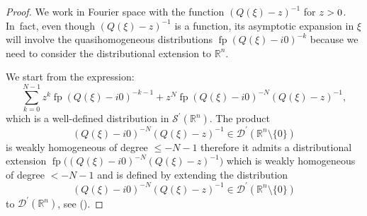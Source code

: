 \documentclass[10pt]{amsart}
\let\pazocal\mathscr
\theoremstyle{definition}
\let\Im\relax
\DeclareMathOperator{\Im}{Im}
\DeclareMathOperator*{\pf}{fp}
\begin{document}
\begin{proof}
We work in Fourier space with
the function $\left(Q(\xi)-z\right)^{-1}$ for $\Im z>0$.
In~fact, even though $\left(Q(\xi)-z\right)^{-1}$ is a function, its asymptotic expansion in $\xi$ will involve the quasihomogeneous distributions
$\pf(Q(\xi)-i0)^{-k}$
because we need to consider the distributional extension to $\mathbb{R}^n$.

We start from the expression:
\[
\sum_{k=0}^{N-1} z^k\pf \left(Q(\xi)-i0\right)^{-k-1}+z^N\pf\left(Q(\xi)-i0\right)^{-N} \left(Q(\xi)-z\right)^{-1},
\]
which is a well-defined
distribution in $\pazocal{S}^\prime(\mathbb{R}^n)$.
The product
\[
\left(Q(\xi)-i0\right)^{-N} \left(Q(\xi)-z\right)^{-1} \in \pazocal{D}^\prime(\mathbb{R}^n\setminus\{0\})
\]
is weakly homogeneous of degree $\leqslant -N-1 $ therefore it admits a distributional extension
$\pf\bigl(\left(Q(\xi)-i0\right)^{-N} \left(Q(\xi)-z\right)^{-1}\bigr)$ which is weakly homogeneous of degree $<-N-1$ and is defined by extending the distribution
\[
\left(Q(\xi)-i0\right)^{-N} \left(Q(\xi)-z\right)^{-1}\in \pazocal{D}^\prime(\mathbb{R}^n\setminus\{0\})
\]
to $\pazocal{D}^\prime(\mathbb{R}^n)$, see \cite[Th.\,1.7]{DangAHP} (\cf \cite{Meyer}).


\end{proof}
\end{document}
